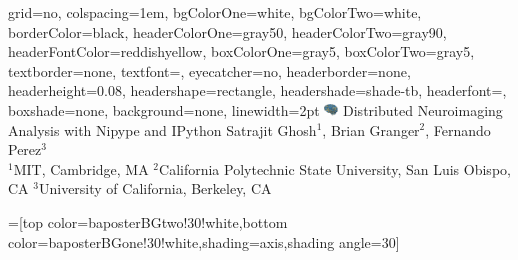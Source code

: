 \documentclass[portrait,final]{baposter}
\begin{document}
\newlength{\leftimgwidth}
\begin{poster}%
  {
  grid=no,
  colspacing=1em,
  bgColorOne=white,
  bgColorTwo=white,
  borderColor=black,
  headerColorOne=gray50,
  headerColorTwo=gray90,
  headerFontColor=reddishyellow,
  boxColorOne=gray5,
  boxColorTwo=gray5,
  textborder=none, %
  textfont=\sf, %
  eyecatcher=no,
  headerborder=none,
  headerheight=0.08\textheight,
  headershape=rectangle,
  headershade=shade-tb,
  headerfont=\Large\textsf, %
  boxshade=none, %
  background=none,
  linewidth=2pt
  }
  {\includegraphics[width=1em]{nipylogo}} %
  {\sf %
  Distributed Neuroimaging Analysis with Nipype and IPython\vspace{0.15em}}
  {\sf %
  Satrajit Ghosh$^1$, Brian Granger$^2$, Fernando Perez$^3$\\
  \small\sf$^1$MIT, Cambridge, MA $^2$California Polytechnic State
  University, San Luis Obispo, CA $^3$University of California,
  Berkeley, CA}



  =[top color=baposterBGtwo!30!white,bottom color=baposterBGone!30!white,shading=axis,shading angle=30]

     \setlength{\leftimgwidth}{0.78em+8.0em}

   \newcommand{\colouredcircle}[1]{%
      \tikz{\useasboundingbox (-0.2em,-0.32em) rectangle(0.2em,0.32em); \draw[draw=black,fill=headerFontColor!80!black!#1!white,line width=0.03em] (0,0) circle(0.18em);}}
    \renewcommand{\labelitemi}{\colouredcircle{100}}
    \renewcommand{\labelitemii}{\colouredcircle{50}}


\end{poster}
\end{document}
